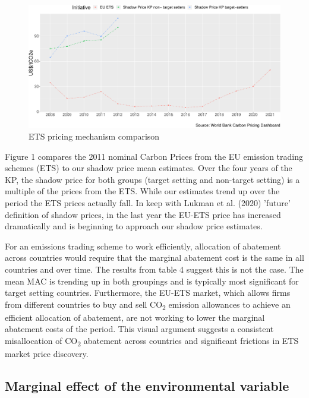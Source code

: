 \documentclass[
  10pt,
]{article}
\begin{document}
\begin{figure}[H]
\includegraphics{figures/paper-ETS comparision-1} \caption{ETS pricing mechanism comparison}\label{fig:ETS comparision}
\end{figure}

Figure 1 compares the 2011 nominal Carbon Prices from the EU emission
trading schemes (ETS) to our shadow price mean estimates. Over the four
years of the KP, the shadow price for both groups (target setting and
non-target setting) is a multiple of the prices from the ETS. While our
estimates trend up over the period the ETS prices actually fall.
In keep with Lukman et al. (2020) 'future' definition of shadow prices, in the last year the EU-ETS price has increased
dramatically and is beginning to approach our shadow price estimates.

For an emissions trading scheme to work efficiently, allocation of
abatement across countries would require that the marginal abatement
cost is the same in all countries and over time. The results from table
4 suggest this is not the case. The mean MAC is trending up in both
groupings and is typically most significant for target setting
countries. Furthermore, the EU-ETS market, which allows firms from
different countries to buy and sell CO\textsubscript{2} emission
allowances to achieve an efficient allocation of abatement, are not
working to lower the marginal abatement costs of the period. This visual
argument suggests a consistent misallocation of CO\textsubscript{2}
abatement across countries and significant frictions in ETS market price
discovery.

\hypertarget{marginal-effect-of-the-environmental-variable}{%
\subsection{Marginal effect of the environmental
variable}\label{marginal-effect-of-the-environmental-variable}}
\end{document}
